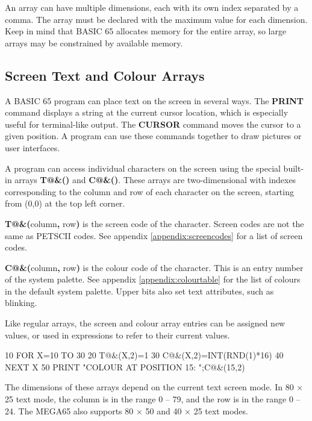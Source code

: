 An array can have multiple dimensions, each with its own index separated by a
comma. The array must be declared with the maximum value for each dimension.
Keep in mind that BASIC 65 allocates memory for the entire array, so large
arrays may be constrained by available memory.


\subsection{Screen Text and Colour Arrays}
\label{sec:screentextandcolourarrays}

A BASIC 65 program can place text on the screen in several ways. The {\bf
PRINT} command displays a string at the current cursor location, which is
especially useful for terminal-like output. The {\bf CURSOR} command moves the
cursor to a given position. A program can use these commands together to draw
pictures or user interfaces.

A program can access individual characters on the screen using the special
built-in arrays \textbf{T@\&()} and \textbf{C@\&()}. These arrays are
two-dimensional with indexes corresponding to the column and row of each
character on the screen, starting from (0,0) at the top left corner.

\textbf{T@\&(}column{\bf ,} row{\bf )} is the screen code of the character.
Screen codes are not the same as PETSCII codes. See appendix
\vref{appendix:screencodes} for a list of screen codes.

\textbf{C@\&(}column{\bf ,} row{\bf )} is the colour code of the character.
This is an entry number of the system palette. See appendix
\vref{appendix:colourtable} for the list of colours in the default system
palette. Upper bits also set text attributes, such as blinking.

Like regular arrays, the screen and colour array entries can be assigned new
values, or used in expressions to refer to their current values.

\begin{screencode}
10 FOR X=10 TO 30
20 T@&(X,2)=1
30 C@&(X,2)=INT(RND(1)*16)
40 NEXT X
50 PRINT "COLOUR AT POSITION 15: ";C@&(15,2)
\end{screencode}

The dimensions of these arrays depend on the current text screen mode. In 80
$\times$ 25 text mode, the column is in the range 0 -- 79, and the row is in
the range 0 -- 24. The MEGA65 also supports 80 $\times$ 50 and 40 $\times$ 25
text modes.


